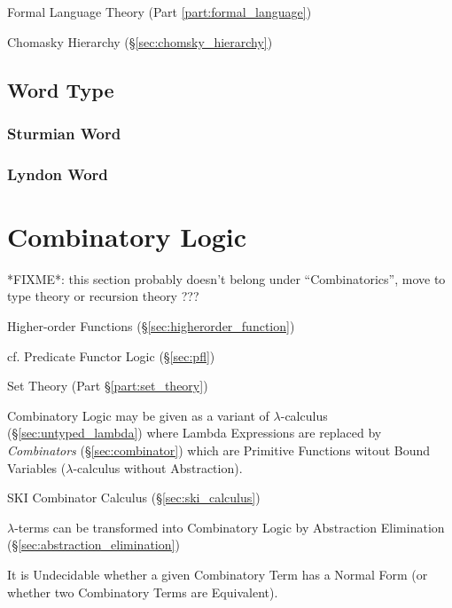 Formal Language Theory (Part \ref{part:formal_language})

Chomasky Hierarchy (\S\ref{sec:chomsky_hierarchy})



\subsection{Word Type}\label{sec:word_type}

\subsubsection{Sturmian Word}\label{sec:sturmian_word}

\subsubsection{Lyndon Word}\label{sec:lyndon_word}



\section{Combinatory Logic}\label{sec:combinatory_logic}

*FIXME*: this section probably doesn't belong under ``Combinatorics'', move to
type theory or recursion theory ???

Higher-order Functions (\S\ref{sec:higherorder_function})

\fist cf. Predicate Functor Logic (\S\ref{sec:pfl})

Set Theory (Part \S\ref{part:set_theory})

Combinatory Logic may be given as a variant of $\lambda$-calculus
(\S\ref{sec:untyped_lambda}) where Lambda Expressions are replaced by
\emph{Combinators} (\S\ref{sec:combinator}) which are Primitive
Functions witout Bound Variables ($\lambda$-calculus without
Abstraction).

SKI Combinator Calculus (\S\ref{sec:ski_calculus})

$\lambda$-terms can be transformed into Combinatory Logic by
Abstraction Elimination (\S\ref{sec:abstraction_elimination})

It is Undecidable whether a given Combinatory Term has a Normal Form
(or whether two Combinatory Terms are Equivalent).

